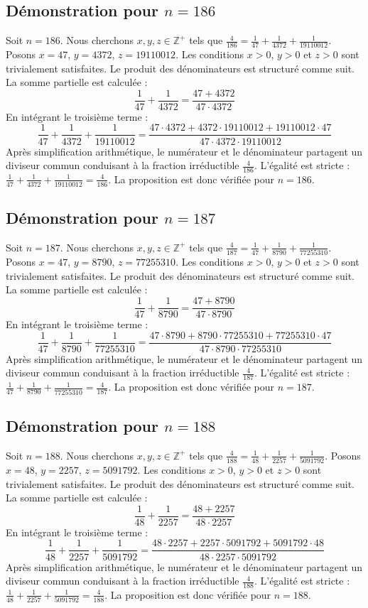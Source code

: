 \documentclass[11pt,a4paper]{article}
\begin{document}
\subsection{Démonstration pour $n = 186$}
Soit $n = 186$. Nous cherchons $x, y, z \in \mathbb{Z}^{+}$ tels que $\frac{4}{186} = \frac{1}{47} + \frac{1}{4372} + \frac{1}{19110012}$.
Posons $x = 47$, $y = 4372$, $z = 19110012$.
Les conditions $x > 0$, $y > 0$ et $z > 0$ sont trivialement satisfaites.
Le produit des dénominateurs est structuré comme suit. La somme partielle est calculée :
$$ \frac{1}{47} + \frac{1}{4372} = \frac{47+4372}{47 \cdot 4372} $$
En intégrant le troisième terme :
$$ \frac{1}{47} + \frac{1}{4372} + \frac{1}{19110012} = \frac{47 \cdot 4372 + 4372 \cdot 19110012 + 19110012 \cdot 47}{47 \cdot 4372 \cdot 19110012} $$
Après simplification arithmétique, le numérateur et le dénominateur partagent un diviseur commun conduisant à la fraction irréductible $\frac{4}{186}$.
L'égalité est stricte : $\frac{1}{47} + \frac{1}{4372} + \frac{1}{19110012} = \frac{4}{186}$.
La proposition est donc vérifiée pour $n = 186$.
\subsection{Démonstration pour $n = 187$}
Soit $n = 187$. Nous cherchons $x, y, z \in \mathbb{Z}^{+}$ tels que $\frac{4}{187} = \frac{1}{47} + \frac{1}{8790} + \frac{1}{77255310}$.
Posons $x = 47$, $y = 8790$, $z = 77255310$.
Les conditions $x > 0$, $y > 0$ et $z > 0$ sont trivialement satisfaites.
Le produit des dénominateurs est structuré comme suit. La somme partielle est calculée :
$$ \frac{1}{47} + \frac{1}{8790} = \frac{47+8790}{47 \cdot 8790} $$
En intégrant le troisième terme :
$$ \frac{1}{47} + \frac{1}{8790} + \frac{1}{77255310} = \frac{47 \cdot 8790 + 8790 \cdot 77255310 + 77255310 \cdot 47}{47 \cdot 8790 \cdot 77255310} $$
Après simplification arithmétique, le numérateur et le dénominateur partagent un diviseur commun conduisant à la fraction irréductible $\frac{4}{187}$.
L'égalité est stricte : $\frac{1}{47} + \frac{1}{8790} + \frac{1}{77255310} = \frac{4}{187}$.
La proposition est donc vérifiée pour $n = 187$.
\subsection{Démonstration pour $n = 188$}
Soit $n = 188$. Nous cherchons $x, y, z \in \mathbb{Z}^{+}$ tels que $\frac{4}{188} = \frac{1}{48} + \frac{1}{2257} + \frac{1}{5091792}$.
Posons $x = 48$, $y = 2257$, $z = 5091792$.
Les conditions $x > 0$, $y > 0$ et $z > 0$ sont trivialement satisfaites.
Le produit des dénominateurs est structuré comme suit. La somme partielle est calculée :
$$ \frac{1}{48} + \frac{1}{2257} = \frac{48+2257}{48 \cdot 2257} $$
En intégrant le troisième terme :
$$ \frac{1}{48} + \frac{1}{2257} + \frac{1}{5091792} = \frac{48 \cdot 2257 + 2257 \cdot 5091792 + 5091792 \cdot 48}{48 \cdot 2257 \cdot 5091792} $$
Après simplification arithmétique, le numérateur et le dénominateur partagent un diviseur commun conduisant à la fraction irréductible $\frac{4}{188}$.
L'égalité est stricte : $\frac{1}{48} + \frac{1}{2257} + \frac{1}{5091792} = \frac{4}{188}$.
La proposition est donc vérifiée pour $n = 188$.
\end{document}
